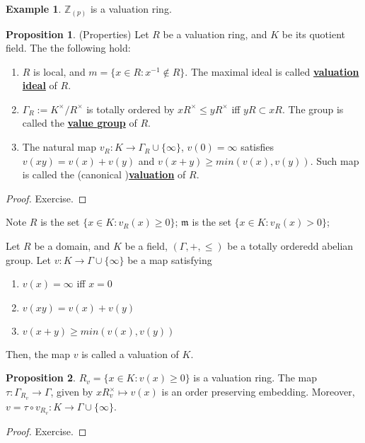 \documentclass{article}
\theoremstyle{definition}
\theoremstyle{definition}
\theoremstyle{definition}
\newtheorem{proposition}{Proposition}[section]
\theoremstyle{definition}
\theoremstyle{definition}
\theoremstyle{definition}
\theoremstyle{definition}
\newtheorem{example}{Example}[section]
\begin{document}
\begin{tcolorbox}[colback=yellow!5!white,colframe=yellow!30!white]
\begin{example}
$\mathbb{Z}_{(p)}$ is a valuation ring. 
\end{example}
\end{tcolorbox}


\begin{tcolorbox}[colback=blue!5!white,colframe=blue!30!white]
\begin{proposition}
(Properties) Let $R$ be a valuation ring, and $K$ be its quotient field. The the following hold:
\begin{enumerate}
    \item $R$ is local, and $m=\{x\in R: x^{-1}\not \in R\}$. The maximal ideal is called \underline{\textbf{valuation ideal}} of $R$.
    \item $\Gamma_R:=K^{\times}/R^{\times}$ is totally ordered by $xR^{\times}\leq yR^{\times}$ iff $yR\subset xR$. The group is called the \underline{\textbf{value group}} of $R$.
    \item The natural map $v_R: K\to \Gamma_R\cup \{\infty\}$, $v(0)=\infty$ satisfies $v(xy)=v(x)+v(y)$ and $v(x+y)\geq min(v(x),v(y))$. Such map is called the (canonical )\underline{\textbf{valuation}} of $R$.
\end{enumerate}
\end{proposition}
\end{tcolorbox}
\begin{proof}
    Exercise.
\end{proof}
Note $R$ is the set $\{ x\in K:v_R(x)\geq 0 \}$; $\mathfrak{m}$ is the set $\{ x\in K:v_R(x)> 0 \}$;

Let $R$ be a domain, and $K$ be a field, $(\Gamma,+,\leq )$ be a totally orderedd abelian group. Let $v: K\to \Gamma\cup \{\infty\}$ be a map satisfying 
\begin{enumerate}
    \item $v(x)=\infty$ iff $x=0$
    \item $v(xy)=v(x)+v(y)$
    \item $v(x+y)\geq min(v(x),v(y))$
\end{enumerate}
Then, the map $v$ is called a valuation of $K$.
\begin{tcolorbox}[colback=blue!5!white,colframe=blue!30!white]
\begin{proposition}
$R_v=\{ x\in K:v(x)\geq 0 \}$ is a valuation ring. The map $\tau: \Gamma_{R_v}\to \Gamma$, given by $xR_v^{\times}\mapsto v(x)$ is an order preserving embedding. Moreover, $v=\tau \circ v_{R_v}: K\to \Gamma\cup \{\infty\}$.
\end{proposition}
\end{tcolorbox}
\begin{proof}
    Exercise.
\end{proof}
\end{document}
